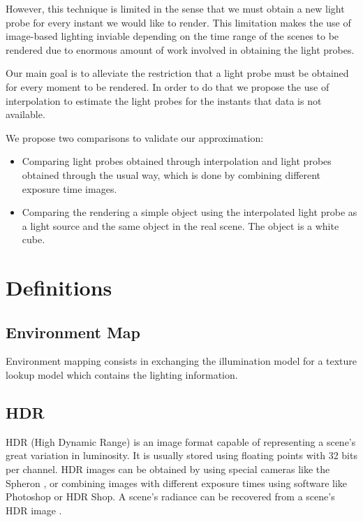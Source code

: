\documentclass[conference]{acmsiggraph}
\begin{document}
	However, this technique is limited in the sense that we must obtain a new light probe for every instant we would like to render. This limitation makes the use of image-based lighting inviable depending on the time range of the scenes to be rendered due to enormous amount of work involved in obtaining the light probes.

	Our main goal is to alleviate the restriction that a light probe must be obtained for every moment to be rendered. In order to do that we propose the use of interpolation to estimate the light probes for the instants that data is not available.

	We propose two comparisons to validate our approximation:
	\begin{itemize}
		\item Comparing light probes obtained through interpolation and light probes obtained through the usual way, which is done by combining different exposure time images.
		\item Comparing the rendering a simple object using the interpolated light probe as a light source and the same object in the real scene. The object is a white cube.
	\end{itemize}




\section{Definitions}

	\subsection{Environment Map}

		Environment mapping \cite{hughes2013} consists in exchanging the illumination model for a texture lookup model which contains the lighting information.

	\subsection{HDR}

		HDR (High Dynamic Range) is an image format capable of representing a scene’s great variation in luminosity. It is usually stored using floating points with 32 bits per channel. HDR images can be obtained by using special cameras like the Spheron \cite{spheron}, or combining images with different exposure times using software like Photoshop or HDR Shop. A scene’s radiance can be recovered from a scene’s HDR image \cite{debevec1997}.
\end{document}
